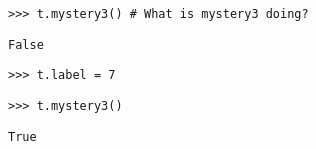 \begin{blocksection}
\begin{lstlisting}
>>> t.mystery3() # What is mystery3 doing?
\end{lstlisting}
\begin{solution}[.5in]
\begin{lstlisting}
False
\end{lstlisting}
\end{solution}

\begin{lstlisting}
>>> t.label = 7
\end{lstlisting}

\begin{lstlisting}
>>> t.mystery3()
\end{lstlisting}
\begin{solution}[.5in]
\begin{lstlisting}
True
\end{lstlisting}
\end{solution}

\end{blocksection}
